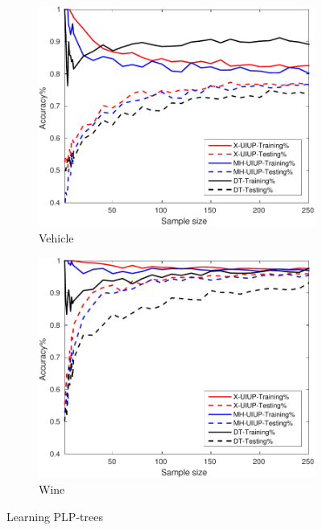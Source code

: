 \begin{figure}[ht]
\begin{subfigure}[b]{0.3\textwidth}
  	\includegraphics[width=\textwidth]{figs/PLPTF/Trees/VehicleDownsampledFurther_Trees_X_MH.pdf}
  	\caption{Vehicle}
		\label{fig:V1}
	\end{subfigure}
  \begin{subfigure}[b]{0.3\textwidth}
		\centering
  	\includegraphics[width=\textwidth]{figs/PLPTF/Trees/WineDownsampled_Trees_X_MH.pdf}
  	\caption{Wine}
		\label{fig:W1}
	\end{subfigure}

  \caption{Learning PLP-trees}
  \label{fig:trees1}
\end{figure}

